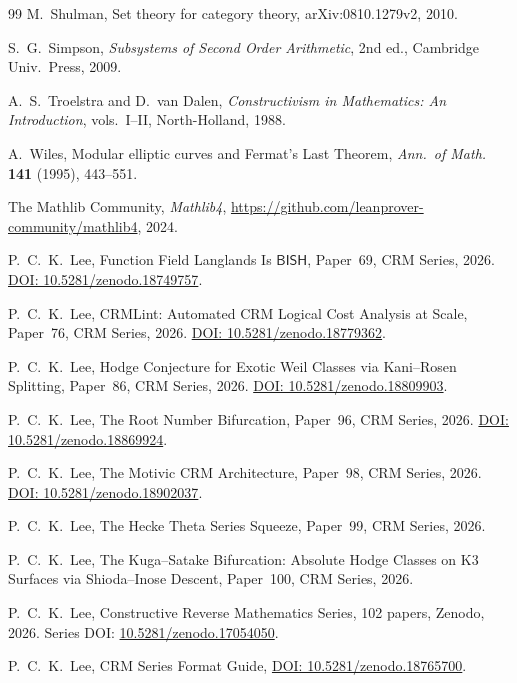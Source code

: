 \documentclass[11pt,a4paper]{article}
\theoremstyle{plain}
\theoremstyle{definition}
\newcommand{\BISH}{\textsf{BISH}}
\begin{document}
\begin{thebibliography}{99}
M.~Shulman,
Set theory for category theory,
arXiv:0810.1279v2, 2010.

S.~G.~Simpson,
\emph{Subsystems of Second Order Arithmetic},
2nd ed., Cambridge Univ.\ Press, 2009.

A.~S.~Troelstra and D.~van Dalen,
\emph{Constructivism in Mathematics: An Introduction},
vols.~I--II, North-Holland, 1988.

A.~Wiles,
Modular elliptic curves and Fermat's Last Theorem,
\emph{Ann.\ of Math.} \textbf{141} (1995), 443--551.

The Mathlib Community,
\emph{Mathlib4},
\url{https://github.com/leanprover-community/mathlib4}, 2024.


P.~C.~K.~Lee,
Function Field Langlands Is $\BISH$,
Paper~69, CRM Series, 2026.
\href{https://doi.org/10.5281/zenodo.18749757}{DOI: 10.5281/zenodo.18749757}.

P.~C.~K.~Lee,
CRMLint: Automated CRM Logical Cost Analysis at Scale,
Paper~76, CRM Series, 2026.
\href{https://doi.org/10.5281/zenodo.18779362}{DOI: 10.5281/zenodo.18779362}.

P.~C.~K.~Lee,
Hodge Conjecture for Exotic Weil Classes via Kani--Rosen Splitting,
Paper~86, CRM Series, 2026.
\href{https://doi.org/10.5281/zenodo.18809903}{DOI: 10.5281/zenodo.18809903}.

P.~C.~K.~Lee,
The Root Number Bifurcation,
Paper~96, CRM Series, 2026.
\href{https://doi.org/10.5281/zenodo.18869924}{DOI: 10.5281/zenodo.18869924}.

P.~C.~K.~Lee,
The Motivic CRM Architecture,
Paper~98, CRM Series, 2026.
\href{https://doi.org/10.5281/zenodo.18902037}{DOI: 10.5281/zenodo.18902037}.

P.~C.~K.~Lee,
The Hecke Theta Series Squeeze,
Paper~99, CRM Series, 2026.

P.~C.~K.~Lee,
The Kuga--Satake Bifurcation: Absolute Hodge Classes on K3 Surfaces via Shioda--Inose Descent,
Paper~100, CRM Series, 2026.

P.~C.~K.~Lee,
Constructive Reverse Mathematics Series,
102 papers, Zenodo, 2026.
Series DOI: \href{https://doi.org/10.5281/zenodo.17054050}{10.5281/zenodo.17054050}.

P.~C.~K.~Lee,
CRM Series Format Guide,
\href{https://doi.org/10.5281/zenodo.18765700}{DOI: 10.5281/zenodo.18765700}.

\end{thebibliography}
\end{document}
